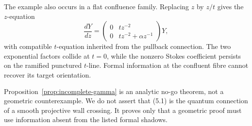 The example also occurs in a flat confluence family.  Replacing \(z\) by
\(z/t\) gives the \(z\)-equation
\[
 \frac{dY}{dz}=
 \begin{pmatrix}0&t z^{-2}\\0&t z^{-2}+\alpha z^{-1}\end{pmatrix}Y,
                                                               \tag{5.6}
\]
with compatible \(t\)-equation inherited from the pullback connection.  The
two exponential factors collide at \(t=0\), while the nonzero Stokes
coefficient persists on the ramified punctured \(t\)-line.  Formal information
at the confluent fibre cannot recover its target orientation.

\begin{remark}
Proposition~\ref{prop:incomplete-gamma} is an analytic no-go theorem, not a
geometric counterexample.  We do not assert that (5.1) is the quantum
connection of a smooth projective wall crossing.  It proves only that a
geometric proof must use information absent from the listed formal shadows.
\end{remark}
